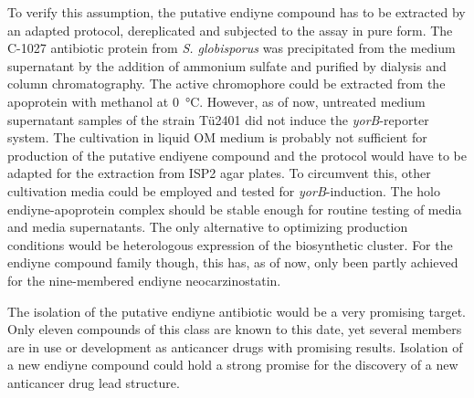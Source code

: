 	 To verify this assumption, the putative endiyne compound has to be extracted by an adapted protocol, dereplicated and subjected to the assay in pure form. The C-1027 antibiotic protein from \textit{S. globisporus} was precipitated from the medium supernatant by the addition of ammonium sulfate and purified by dialysis and column chromatography.\autocite{Otani1988a} The active chromophore could be extracted from the apoprotein with methanol at \SI{0}{\celsius}. \autocite{Matsumoto1993} However, as of now, untreated medium supernatant samples of the strain Tü2401 did not induce the \textit{yorB}-reporter system. The cultivation in liquid OM medium is probably not sufficient for production of the putative endiyene compound and the protocol would have to be adapted for the extraction from ISP2 agar plates. To circumvent this, other cultivation media could be employed and tested for \textit{yorB}-induction. The holo endiyne-apoprotein complex should be stable enough for routine testing of media and media supernatants. The only alternative to optimizing production conditions would be heterologous expression of the biosynthetic cluster. For the endiyne compound family though, this has, as of now, only been partly achieved for the nine-membered endiyne neocarzinostatin.\autocite{Zhang2008}
	 
	 The isolation of the putative endiyne antibiotic would be a very promising target. Only eleven compounds of this class are known to this date, yet several members are in use or development as anticancer drugs with promising results.\autocite{Liang2010,Galm2005} Isolation of a new endiyne compound could  hold a strong promise for the discovery of a new anticancer drug lead structure.
	 


